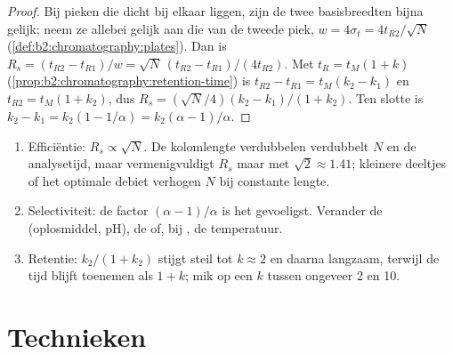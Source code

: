 \begin{proof}
Bij pieken die dicht bij elkaar liggen, zijn de twee basisbreedten bijna gelijk; neem ze allebei gelijk aan die van de tweede piek,
$w = 4\sigma_t = 4t_{R2}/\sqrt N$ (\cref{def:b2:chromatography:plates}). Dan is $R_s = (t_{R2} -
t_{R1})/w = \sqrt N\,(t_{R2} - t_{R1})/(4t_{R2})$. Met $t_R = t_M(1 + k)$
(\cref{prop:b2:chromatography:retention-time}) is $t_{R2} - t_{R1} = t_M(k_2 - k_1)$ en $t_{R2} =
t_M(1 + k_2)$, dus $R_s = (\sqrt N/4)(k_2 - k_1)/(1 + k_2)$. Ten slotte is $k_2 - k_1 = k_2(1 - 1/\alpha) =
k_2(\alpha - 1)/\alpha$.
\end{proof}

\begin{method}\label{met:b2:chromatography:improve-resolution}
\begin{enumerate}
  \item Efficiëntie: $R_s \propto \sqrt N$. De kolomlengte verdubbelen verdubbelt $N$ en de analysetijd,
        maar vermenigvuldigt $R_s$ maar met $\sqrt2 \approx 1.41$; kleinere deeltjes of het optimale debiet
        verhogen $N$ bij constante lengte.
  \item Selectiviteit: de factor $(\alpha - 1)/\alpha$ is het gevoeligst. Verander de 
        (oplosmiddel, pH), de  of, bij , de temperatuur.
  \item Retentie: $k_2/(1+k_2)$ stijgt steil tot $k \approx 2$ en daarna langzaam, terwijl de tijd
        blijft toenemen als $1 + k$; mik op een $k$ tussen ongeveer 2 en 10.
\end{enumerate}
\end{method}

\section{Technieken}

